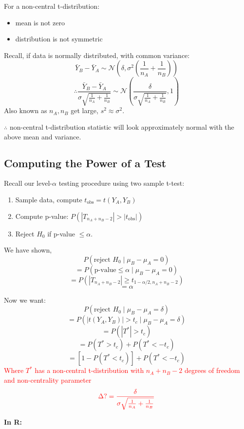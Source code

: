 \documentclass[14pt]{extarticle}
\begin{document}
For a non-central t-distribution:
\begin{itemize}
    \item mean is not zero
    \item distribution is not symmetric
\end{itemize}

\noindent Recall, if data is normally distributed, with common variance:
\[
\bar{Y}_B - \bar{Y}_A \sim \mathcal{N} \left( \delta, \sigma^2 \left( \frac{1}{n_A} + \frac{1}{n_B} \right) \right)
\]
\[
\therefore \frac{\bar{Y}_B - \bar{Y}_A}{\sigma \sqrt{\frac{1}{n_A} + \frac{1}{n_B}}} \sim \mathcal{N} \left( \frac{\delta}{\sigma \sqrt{\frac{1}{n_A} + \frac{1}{n_B}}}, 1 \right)
\]
Also known as \( n_A, n_B \) get large, \( s^2 \approx \sigma^2 \).

$\therefore$ non-central t-distribution statistic will look approximately normal with the above mean and variance.

\subsection*{Computing the Power of a Test}

Recall our level-\(\alpha\) testing procedure using two sample t-test:

\begin{enumerate}
    \item Sample data, compute \( t_{\text{obs}} = t(Y_A, Y_B) \)
    \item Compute p-value: \( P\left( |T_{n_A+n_B-2}| > |t_{\text{obs}}| \right) \)
    \item Reject \( H_0 \) if p-value \(\leq \alpha\).
\end{enumerate}

We have shown,
\[
P(\text{reject } H_0 \mid \mu_B - \mu_A = 0)
\]
\[
= P(\text{p-value} \leq \alpha \mid \mu_B - \mu_A = 0)
\]
\[
= P(|T_{n_A+n_B-2}| \geq t_{1-\alpha/2, n_A + n_B - 2})
\]
\[
= \alpha
\]

Now we want:
\[
P(\text{reject } H_0 \mid \mu_B - \mu_A = \delta)
\]
\[
= P\left( |t(Y_A, Y_B)| > t_c \mid \mu_B - \mu_A = \delta \right)
\]
\[
= P(|T^*| > t_c)
\]
\[
= P(T^* > t_c) + P(T^* < -t_c)
\]
\[
= \left[ 1 - P(T^* < t_c) \right] + P(T^* < -t_c)
\]
\textcolor{red}{Where $T^*$ has a non-central t-distribution with $n_A + n_B - 2$ degrees of freedom and non-centrality parameter}
\[\textcolor{red}{
\Delta ? = \frac{\delta}{\sigma \sqrt{\frac{1}{n_A} + \frac{1}{n_B}}}
}\]

\noindent \textbf{In R:} \\
\end{document}
